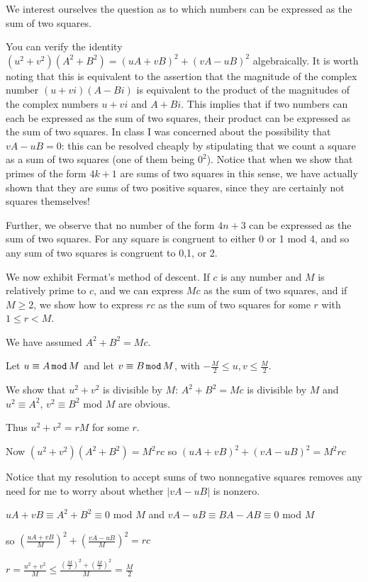\documentclass[12pt]{article}
\begin{document}
We interest ourselves the question as to which numbers can be expressed as the sum of two squares.

You can verify the identity $(u^2+v^2)(A^2+B^2)=(uA+vB)^2+(vA-uB)^2$ algebraically.   It is worth noting that this is equivalent to the assertion that the magnitude of the complex number $(u+vi)(A-Bi)$ is equivalent to the product
of the magnitudes of the complex numbers $u+vi$ and $A+Bi$.   This implies that if two numbers can each be expressed as the sum of two squares, their product can be expressed as the sum of two squares.  In class I was concerned about the possibility that $vA-uB=0$:  this can be resolved cheaply by stipulating that we count a square as a sum of two squares (one of them being $0^2$).  Notice that when we show that primes of the form $4k+1$ are sums of two squares in this sense, we have actually shown that they are sums of two positive squares, since they are certainly not squares themselves!

Further, we observe that no number of the form $4n+3$ can be expressed as the sum of two squares.  For any square is congruent to either 0 or 1 mod 4, and so any sum of two squares is congruent to 0,1, or 2.

We now exhibit Fermat's method of descent.   If $c$ is any number and $M$ is relatively prime to $c$, and we can express $Mc$ as the sum of two squares, and if $M \geq 2$, we show how to express $rc$ as the sum of two squares
for some $r$ with $1\leq r<M$.

We have assumed $A^2+B^2 = Mc$.

Let $u\equiv A \,{\tt mod}\,M$
and let $v \equiv B\,{\tt mod} \,M$,
with $-\frac M2 \leq u,v \leq \frac M2$.

We show that $u^2+v^2$ is divisible by $M$:  $A^2+B^2 = Mc$ is divisible by $M$ and $u^2\equiv A^2$, $v^2 \equiv B^2$ mod $M$ are obvious.

Thus $u^2+v^2=rM$ for some $r$.

Now $(u^2+v^2)(A^2+B^2)=M^2rc$  so $(uA+vB)^2+(vA-uB)^2=M^2rc$

Notice that my resolution to accept sums of two nonnegative squares removes any need for me to worry about whether $|vA-uB|$ is nonzero.

$uA+vB\equiv A^2+B^2 \equiv 0$ mod $M$ and $vA-uB\equiv BA-AB \equiv 0$ mod $M$

so $(\frac{uA+vB}M)^2+(\frac{vA-uB}M)^2=rc$

$r = \frac{u^2+v^2}M \leq \frac{(\frac M2)^2+(\frac M2)^2}M = \frac M2$
\end{document}
